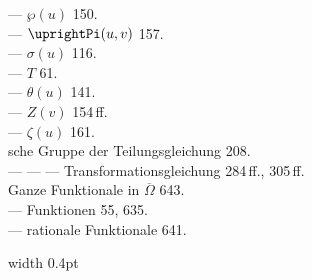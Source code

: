 \begin{minipage}[t]{0.48\textwidth}
--- $\wp(u)$ 150. \\
--- $\uprightPi(u,v)$ 157. \\
--- $\sigma(u)$ 116. \\
--- $T$ 61. \\
--- $\theta(u)$ 141. \\
--- $Z(v)$ 154\,ff. \\
--- $\zeta(u)$ 161. \\[4pt]
sche Gruppe der Teilungsgleichung 208. \\
--- --- --- Transformationsgleichung 284\,ff., 305\,ff. \\
Ganze Funktionale in $\overline{\Omega}$ 643. \\
--- Funktionen 55, 635. \\
--- rationale Funktionale 641.
\end{minipage}%
\hfill\vrule width 0.4pt\hfill
